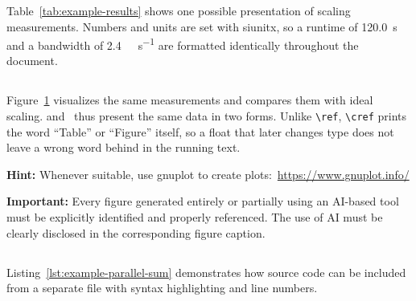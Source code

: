 Table~\ref{tab:example-results} shows one possible presentation of scaling measurements.
Numbers and units are set with siunitx, so a runtime of \qty{120.0}{\second} and a bandwidth of \qty{2.4}{\giga\byte\per\second} are formatted identically throughout the document.


\subsection{}
\label{sec:performance-plot}

Figure~\ref{fig:example-scaling} visualizes the same measurements and compares them with ideal scaling.
 and~ thus present the same data in two forms.
Unlike \verb|\ref|, \verb|\cref| prints the word \enquote{Table} or \enquote{Figure} itself, so a float that later changes type does not leave a wrong word behind in the running text.

\textbf{Hint:} Whenever suitable, use gnuplot to create plots:~\url{https://www.gnuplot.info/}

\textbf{Important:} Every figure generated entirely or partially using an AI-based tool must be explicitly identified and properly referenced.
The use of AI must be clearly disclosed in the corresponding figure caption.

\begin{figure}[htbp]
  \centering
  \resizebox{0.75\textwidth}{!}{}
  \caption{}
  \label{fig:example-scaling}
\end{figure}

\subsection{}
\label{sec:source-code-listing}
Listing~\ref{lst:example-parallel-sum} demonstrates how source code can be included from a separate file with syntax highlighting and line numbers.


